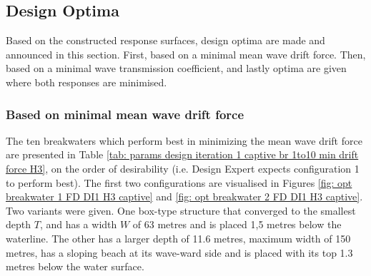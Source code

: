 \subsection{Design Optima}
\label{sec: DI1 captive H3 design optima}

Based on the constructed response surfaces, design optima are made and announced in this section. First, based on a minimal mean wave drift force. Then, based on a minimal wave transmission coefficient, and lastly optima are given where both responses are minimised. 


\subsubsection{Based on minimal mean wave drift force}
The ten breakwaters which perform best in minimizing the mean wave drift force are presented in Table \ref{tab: params design iteration 1 captive br 1to10 min drift force H3}, on the order of desirability (i.e. Design Expert expects configuration 1 to perform best). The first two configurations are visualised in Figures \ref{fig: opt breakwater 1 FD DI1 H3 captive} and \ref{fig: opt breakwater 2 FD DI1 H3 captive}. Two variants were given. One box-type structure that converged to the smallest depth $T$, and has a width $W$ of 63 metres and is placed 1,5 metres below the waterline. The other has a larger depth of 11.6 metres, maximum width of 150 metres, has a sloping beach at its wave-ward side and is placed with its top 1.3 metres below the water surface. 

